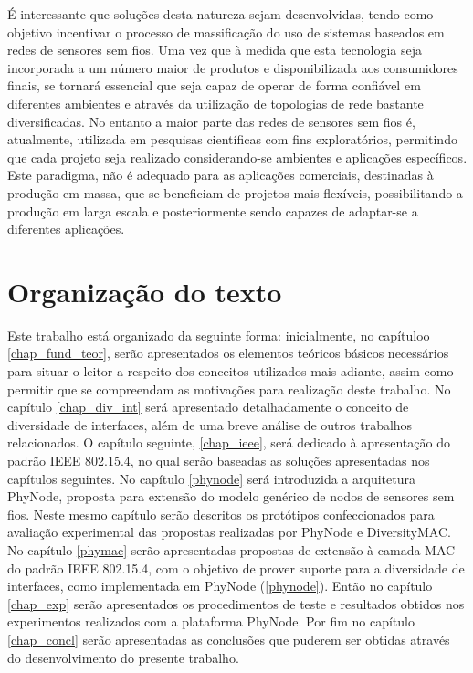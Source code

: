 \documentclass[
	12pt,				%
	openright,			%
	oneside,
	a4paper,			%
	english,			%
	french,				%
	spanish,			%
	brazil				%
	]{abntex2}
\begin{document}
É interessante que soluções desta natureza sejam desenvolvidas, tendo como objetivo incentivar o processo de massificação do uso de sistemas baseados em redes de sensores sem fios. Uma vez que à medida que esta tecnologia seja incorporada a um número maior de produtos e disponibilizada aos consumidores finais, se tornará essencial que seja capaz de operar de forma confiável em diferentes ambientes e através da utilização de topologias de rede bastante diversificadas. No entanto a maior parte das redes de sensores sem fios é, atualmente, utilizada em pesquisas científicas com fins exploratórios, permitindo que cada projeto seja realizado considerando-se ambientes e aplicações específicos. Este paradigma, não é adequado para as aplicações comerciais, destinadas à produção em massa, que se beneficiam de projetos mais flexíveis, possibilitando a produção em larga escala e posteriormente sendo capazes de adaptar-se a diferentes aplicações.

\section{Organização do texto}
Este trabalho está organizado da seguinte forma: inicialmente, no capítuloo \ref{chap_fund_teor}, serão apresentados os elementos teóricos básicos necessários para situar o leitor a respeito dos conceitos utilizados mais adiante, assim como permitir que se compreendam as motivações para realização deste trabalho. No capítulo \ref{chap_div_int} será apresentado detalhadamente o conceito de diversidade de interfaces, além de uma breve análise de outros trabalhos relacionados. O capítulo seguinte, \ref{chap_ieee}, será dedicado à apresentação do padrão IEEE 802.15.4, no qual serão baseadas as soluções apresentadas nos capítulos seguintes. No capítulo \ref{phynode} será introduzida a arquitetura PhyNode, proposta para extensão do modelo genérico de nodos de sensores sem fios. Neste mesmo capítulo serão descritos os protótipos confeccionados para avaliação experimental das propostas realizadas por PhyNode e DiversityMAC. No capítulo \ref{phymac} serão apresentadas propostas de extensão à camada MAC do padrão IEEE 802.15.4, com o objetivo de prover suporte para a diversidade de interfaces, como implementada em PhyNode (\ref{phynode}). Então no capítulo \ref{chap_exp} serão apresentados os procedimentos de teste e resultados obtidos nos experimentos realizados com a plataforma PhyNode. Por fim no capítulo \ref{chap_concl} serão apresentadas as conclusões que puderem ser obtidas através do desenvolvimento do presente trabalho.
\end{document}
